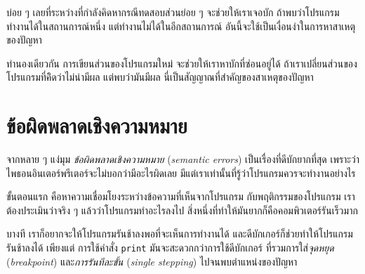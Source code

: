 บ่อย ๆ เลยที่ระหว่างที่กำลังคิดหากรณีทดสอบส่วนย่อย ๆ จะช่วยให้เราเจอบัก
ถ้าพบว่าโปรแกรมทำงานได้ในสถานการณ์หนึ่ง
แต่ทำงานไม่ได้ในอีกสถานการณ์ 
อันนี้จะใช้เป็นเงื่อนงำในการหาสาเหตุของปัญหา


ทำนองเดียวกัน
การเขียนส่วนของโปรแกรมใหม่
จะช่วยให้เราหาบักที่ซ่อนอยู่ได้
ถ้าเราเปลี่ยนส่วนของโปรแกรมที่คิิดว่าไม่น่ามีผล
แต่พบว่ามันมีผล
นี่เป็นสัญญาณที่สำคัญของสาเหตุของปัญหา


\section{ข้อผิดพลาดเชิงความหมาย}


จากหลาย ๆ แง่มุม
\textit{ข้อผิดพลาดเชิงความหมาย} (\textit{semantic errors})
เป็นเรื่องที่ดีบักยากที่สุด
เพราะว่า 
ไพธอนอินเตอร์พรีเตอร์จะไม่บอกว่ามีอะไรผิดเลย
มีแต่เราเท่านั้นที่รู้ว่าโปรแกรมควรจะทำงานอย่างไร



ขั้นตอนแรก คือหาความเชื่อมโยงระหว่างข้อความที่เห็นจากโปรแกรม กับพฤติกรรมของโปรแกรม
เราต้องประเมินว่าจริง ๆ แล้วว่าโปรแกรมทำอะไรลงไป
สิ่งหนึ่งที่ทำให้มันยากก็คือคอมพิวเตอร์รันเร็วมาก


บางที เราก็อยากจะให้โปรแกรมรันช้าลงพอที่จะเห็นการทำงานได้
และดีบักเกอร์ก็ช่วยทำให้โปรแกรมรันช้าลงได้
เพียงแต่ การใช้คำสั่ง \texttt{print}
มันจะสะดวกกว่าการใช้ดีบักเกอร์
ที่รวมการใส่\textit{จุดหยุด} (\textit{breakpoint})
และ\textit{การรันทีละขั้น} (\textit{single stepping}) ไปจนพบตำแหน่งของปัญหา

